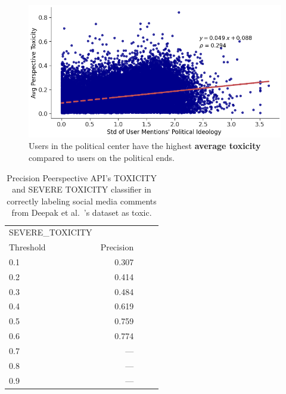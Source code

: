 \begin{figure}
\begin{minipage}[l]{0.8\textwidth}
\includegraphics[width=1\columnwidth]{figures/std_user_mentions.png} 
\end{minipage}

\begin{minipage}[l]{1\textwidth}
\caption{Users in the political center have the highest \textbf{average toxicity} compared to users on the political ends.   \label{fig:toxicity-vs-polarization}}
\end{minipage}

\end{figure}

\begin{table}[t]
\centering
\small
\begin{minipage}[l]{0.4\textwidth}
\begin{tabular}{lrrr}
\toprule
   SEVERE\_TOXICITY \\
   Threshold &   Precision   \\ \midrule
      0.1  &0.307\\
      0.2 &0.414  \\
      0.3& 0.484  \\
      0.4 & 0.619\\
      0.5 & 0.759\\
      0.6 & 0.774 \\
      0.7 & --- & \\
      0.8 & --- & \\
      0.9 & --- &\
\end{tabular}
\end{minipage}
\begin{minipage}[l]{0.4\textwidth}
\caption{Precision Peerspective API's TOXICITY and SEVERE TOXICITY classifier in correctly labeling social media comments from Deepak et al.~\cite{kumar2021designing}'s dataset as toxic. }
\end{minipage}
\label{tbl:ergm}
\end{table}


